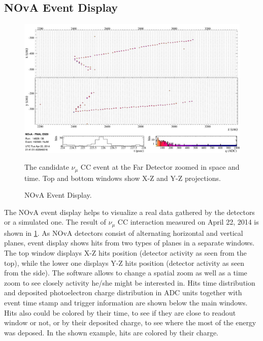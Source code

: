 \subsection{NOvA Event Display}
\begin{figure}
\includegraphics[width=1.0\textwidth]{figures/EventDisp.pdf}\\%
\caption{NOvA Event Display.}
{The candidate $\nu_\mu$ CC event at the Far Detector zoomed in space and time. Top and bottom windows show
X-Z and Y-Z projections.} \label{fig:EVD}
\end{figure}
The NOvA event display helps to visualize a real data gathered by the detectors or a simulated one. The result
of $\nu_\mu$ CC interaction measured on April 22, 2014 is shown in \ref{fig:EVD}. As NOvA detectors consist of 
alternating horizontal and vertical planes, event display shows hits from two types of planes in a separate 
windows. The top window displays X-Z hits position (detector activity as seen from the top), while the lower 
one displays Y-Z hits position (detector activity as seen from the side). The software allows to change a spatial zoom as well as a time zoom to see closely activity he/she might be interested in. Hits time distribution and 
deposited photoelectron charge distribution in ADC units together with event time stamp and trigger information 
are shown below the main windows. Hits also could be colored by their time, to see if they are close to readout 
window or not, or by their deposited charge, to see where the most of the energy was deposed. In the shown 
example, hits are colored by their charge.

